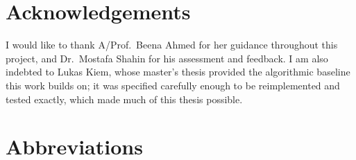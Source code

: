 \chapter*{Acknowledgements}

I would like to thank A/Prof.\ Beena Ahmed for her guidance throughout this
project, and Dr.\ Mostafa Shahin for his assessment and feedback. I am also
indebted to Lukas Kiem, whose master's thesis provided the algorithmic baseline
this work builds on; it was specified carefully enough to be reimplemented and
tested exactly, which made much of this thesis possible.

\chapter*{Abbreviations}


